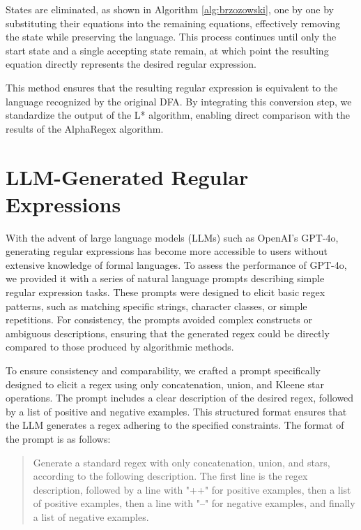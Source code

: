\indent\indent States are eliminated, as shown in Algorithm \ref{alg:brzozowski}, one by one by substituting their equations into the remaining equations, effectively removing the state while preserving the language. This process continues until only the start state and a single accepting state remain, at which point the resulting equation directly represents the desired regular expression.

\indent\indent This method ensures that the resulting regular expression is equivalent to the language recognized by the original DFA. By integrating this conversion step, we standardize the output of the L* algorithm, enabling direct comparison with the results of the AlphaRegex algorithm. \cite{brzozowski_1964_derivatives}

\vspace{-0.4em}
\section{LLM-Generated Regular Expressions}
\vspace{-0.4em}

\indent\indent With the advent of large language models (LLMs) such as OpenAI's GPT-4o, generating regular expressions has become more accessible to users without extensive knowledge of formal languages. To assess the performance of GPT-4o, we provided it with a series of natural language prompts describing simple regular expression tasks. These prompts were designed to elicit basic regex patterns, such as matching specific strings, character classes, or simple repetitions. For consistency, the prompts avoided complex constructs or ambiguous descriptions, ensuring that the generated regex could be directly compared to those produced by algorithmic methods.

\indent\indent To ensure consistency and comparability, we crafted a prompt specifically designed to elicit a regex using only concatenation, union, and Kleene star operations. The prompt includes a clear description of the desired regex, followed by a list of positive and negative examples. This structured format ensures that the LLM generates a regex adhering to the specified constraints. The format of the prompt is as follows:


\begin{quote}
Generate a standard regex with only concatenation, union, and stars, according to the following description. The first line is the regex description, followed by a line with "++" for positive examples, then a list of positive examples, then a line with "--" for negative examples, and finally a list of negative examples.
\end{quote}

